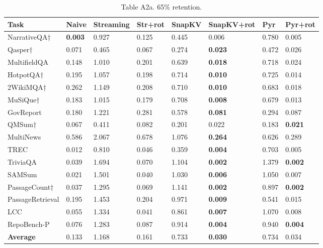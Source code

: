 \documentclass[10pt,letterpaper]{article}
\begin{document}
\begin{table}[H]
\centering
\small
\caption*{Table A2a. 65\% retention.}
\begin{tabular}{@{}llllllll@{}}
\toprule
Task & Naive & Streaming & Str+rot & SnapKV & SnapKV+rot & Pyr &
Pyr+rot\\
\midrule
    NarrativeQA† & \textbf{0.003} & 0.927 & 0.125 & 0.445 & 0.006 & 0.780 & 0.005\\
    Qasper† & 0.071 & 0.465 & 0.067 & 0.274 & \textbf{0.023} & 0.472 & 0.026\\
    MultifieldQA & 0.148 & 1.010 & 0.201 & 0.639 & \textbf{0.018} & 0.718 & 0.024\\
    HotpotQA† & 0.195 & 1.057 & 0.198 & 0.714 & \textbf{0.010} & 0.725 & 0.014\\
    2WikiMQA† & 0.262 & 1.149 & 0.208 & 0.710 & \textbf{0.010} & 0.683 & 0.018\\
    MuSiQue† & 0.183 & 1.015 & 0.179 & 0.708 & \textbf{0.008} & 0.679 & 0.013\\
    GovReport & 0.180 & 1.221 & 0.281 & 0.578 & \textbf{0.081} & 0.294 & 0.087\\
    QMSum† & 0.067 & 0.411 & 0.082 & 0.201 & 0.022 & 0.183 & \textbf{0.021}\\
    MultiNews & 0.586 & 2.067 & 0.678 & 1.076 & \textbf{0.264} & 0.626 & 0.289\\
    TREC & 0.012 & 0.810 & 0.046 & 0.359 & \textbf{0.004} & 0.703 & 0.005\\
    TriviaQA & 0.039 & 1.694 & 0.070 & 1.104 & \textbf{0.002} & 1.379 & \textbf{0.002}\\
    SAMSum & 0.021 & 1.501 & 0.040 & 1.030 & \textbf{0.006} & 1.050 & 0.007\\
    PassageCount† & 0.037 & 1.295 & 0.069 & 1.141 & \textbf{0.002} & 0.897 & \textbf{0.002}\\
    PassageRetrieval & 0.195 & 1.453 & 0.204 & 0.971 & \textbf{0.009} & 0.541 & 0.015\\
    LCC & 0.055 & 1.334 & 0.041 & 0.861 & \textbf{0.007} & 1.070 & 0.008\\
    RepoBench-P & 0.076 & 1.283 & 0.087 & 0.914 & \textbf{0.004} & 0.940 & \textbf{0.004}\\
    \textbf{Average}  &  0.133  &  1.168 &  0.161  &  0.733  &  \textbf{0.030}  &  0.734  &  0.034\\
\bottomrule
\end{tabular}
\end{table}
\end{document}
